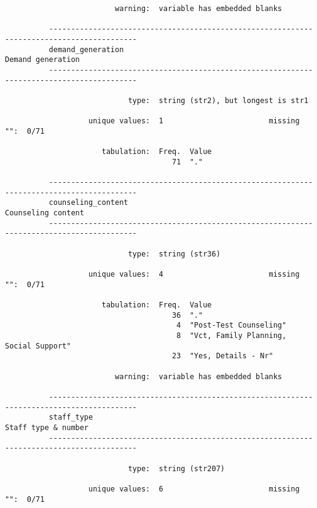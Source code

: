 \documentclass{article}
\begin{document}
\begin{verbatim}
                         warning:  variable has embedded blanks
          
          ------------------------------------------------------------------------------------------
          demand_generation                                                        Demand generation
          ------------------------------------------------------------------------------------------
          
                            type:  string (str2), but longest is str1
          
                   unique values:  1                        missing "":  0/71
          
                      tabulation:  Freq.  Value
                                      71  "."
          
          ------------------------------------------------------------------------------------------
          counseling_content                                                      Counseling content
          ------------------------------------------------------------------------------------------
          
                            type:  string (str36)
          
                   unique values:  4                        missing "":  0/71
          
                      tabulation:  Freq.  Value
                                      36  "."
                                       4  "Post-Test Counseling"
                                       8  "Vct, Family Planning, Social Support"
                                      23  "Yes, Details - Nr"
          
                         warning:  variable has embedded blanks
          
          ------------------------------------------------------------------------------------------
          staff_type                                                             Staff type & number
          ------------------------------------------------------------------------------------------
          
                            type:  string (str207)
          
                   unique values:  6                        missing "":  0/71
          

\end{verbatim}
\end{document}
